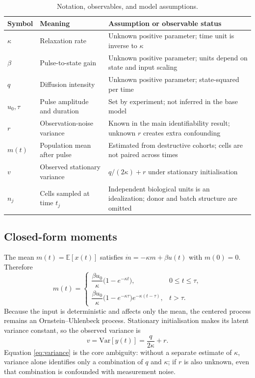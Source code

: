 \documentclass[11pt,a4paper]{article}
\newcommand{\E}{\mathbb{E}}
\newcommand{\Var}{\mathrm{Var}}
\begin{document}
\begin{table}[!htbp]
\centering
\small
\caption{Notation, observables, and model assumptions.}
\label{tab:notation}
\begin{tabularx}{\linewidth}{@{}p{1.65cm}p{2.4cm}X@{}}
\toprule
Symbol & Meaning & Assumption or observable status\\
\midrule
$\kappa$ & Relaxation rate & Unknown positive parameter; time unit is inverse to $\kappa$\\
$\beta$ & Pulse-to-state gain & Unknown positive parameter; units depend on state and input scaling\\
$q$ & Diffusion intensity & Unknown positive parameter; state-squared per time\\
$u_0,\tau$ & Pulse amplitude and duration & Set by experiment; not inferred in the base model\\
$r$ & Observation-noise variance & Known in the main identifiability result; unknown $r$ creates extra confounding\\
$m(t)$ & Population mean after pulse & Estimated from destructive cohorts; cells are not paired across times\\
$v$ & Observed stationary variance & $q/(2\kappa)+r$ under stationary initialisation\\
$n_j$ & Cells sampled at time $t_j$ & Independent biological units is an idealization; donor and batch structure are omitted\\
\bottomrule
\end{tabularx}
\end{table}
\subsection{Closed-form moments}
The mean $m(t)=\E[x(t)]$ satisfies $\dot m=-\kappa m+\beta u(t)$ with $m(0)=0$. Therefore
\begin{equation}
m(t)=
\begin{cases}
\dfrac{\beta u_0}{\kappa}\big(1-e^{-\kappa t}\big),&0\le t\le\tau,\\[0.65em]
\dfrac{\beta u_0}{\kappa}\big(1-e^{-\kappa\tau}\big)e^{-\kappa(t-\tau)},&t>\tau.
\end{cases}
\label{eq:mean}
\end{equation}
Because the input is deterministic and affects only the mean, the centered process remains an Ornstein--Uhlenbeck process. Stationary initialisation makes its latent variance constant, so the observed variance is
\begin{equation}
v=\Var[y(t)]=\frac{q}{2\kappa}+r.
\label{eq:variance}
\end{equation}
Equation \cref{eq:variance} is the core ambiguity: without a separate estimate of $\kappa$, variance alone identifies only a combination of $q$ and $\kappa$; if $r$ is also unknown, even that combination is confounded with measurement noise.
\end{document}
